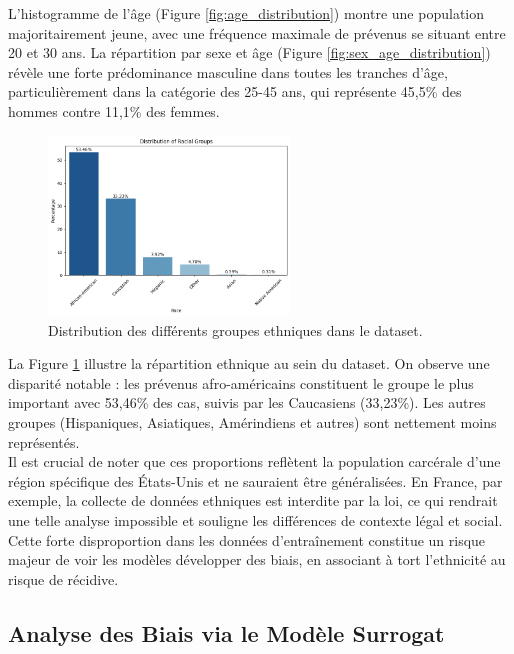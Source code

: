 \documentclass{article}
\begin{document}
\quad L'histogramme de l'âge (Figure \ref{fig:age_distribution}) montre une population majoritairement jeune, avec une fréquence maximale de prévenus se situant entre 20 et 30 ans. La répartition par sexe et âge (Figure \ref{fig:sex_age_distribution}) révèle une forte prédominance masculine dans toutes les tranches d'âge, particulièrement dans la catégorie des 25-45 ans, qui représente 45,5\% des hommes contre 11,1\% des femmes.

\begin{figure}[h!]
    \centering
    \includegraphics[width=0.57\textwidth]{plot_ethnie.png}
    \caption{Distribution des différents groupes ethniques dans le dataset.}
    \label{fig:race_distribution}
\end{figure}


\quad La Figure \ref{fig:race_distribution} illustre la répartition ethnique au sein du dataset. On observe une disparité notable : les prévenus afro-américains constituent le groupe le plus important avec 53,46\% des cas, suivis par les Caucasiens (33,23\%). Les autres groupes (Hispaniques, Asiatiques, Amérindiens et autres) sont nettement moins représentés.\\

Il est crucial de noter que ces proportions reflètent la population carcérale d'une région spécifique des États-Unis et ne sauraient être généralisées. En France, par exemple, la collecte de données ethniques est interdite par la loi, ce qui rendrait une telle analyse impossible et souligne les différences de contexte légal et social. Cette forte disproportion dans les données d'entraînement constitue un risque majeur de voir les modèles développer des biais, en associant à tort l'ethnicité au risque de récidive.

\subsection{Analyse des Biais via le Modèle Surrogat}
\end{document}
